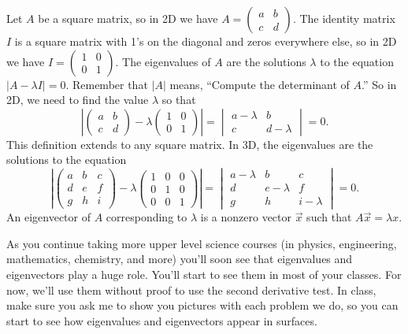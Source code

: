 \begin{definition}
 Let $A$ be a square matrix, so in 2D we have $A=\begin{pmatrix} a&b\\c&d \end{pmatrix}$. The identity matrix $I$ is a square matrix with 1's on the diagonal and zeros everywhere else, so in 2D we have $I = \begin{pmatrix} 1&0\\0&1 \end{pmatrix}$. The eigenvalues of $A$ are the solutions $\lambda$ to the equation $|A-\lambda I|=0$. Remember that $|A|$ means, ``Compute the determinant of $A$.'' So in 2D, we need to find the value $\lambda$ so that 
 $$\left|\begin{pmatrix} a&b\\c&d\end{pmatrix}-\lambda  \begin{pmatrix} 1&0\\0&1 \end{pmatrix} \right|=\begin{vmatrix} a-\lambda &b\\c&d-\lambda \end{vmatrix}=0.$$
 This definition extends to any square matrix.  In 3D, the eigenvalues are the solutions to the equation
 $$\left|\begin{pmatrix} a&b&c\\d&e&f\\g&h&i\end{pmatrix}-\lambda 
\begin{pmatrix} 1&0&0\\0&1&0\\0&0&1\end{pmatrix} \right| = 
           \begin{vmatrix} a-\lambda&b&c\\d&e-\lambda&f\\g&h&i-\lambda\end{vmatrix}=0.$$
 An eigenvector of $A$ corresponding to $\lambda$ is a nonzero vector $\vec x$ such that $A\vec x=\lambda x$. 
\end{definition}

As you continue taking more upper level science courses (in physics, engineering, mathematics, chemistry, and more) you'll soon see that eigenvalues and eigenvectors play a huge role.  You'll start to see them in most of your classes. For now, we'll use them without proof to use the second derivative test. In class, make sure you ask me to show you pictures with each problem we do, so you can start to see how eigenvalues and eigenvectors appear in surfaces.

